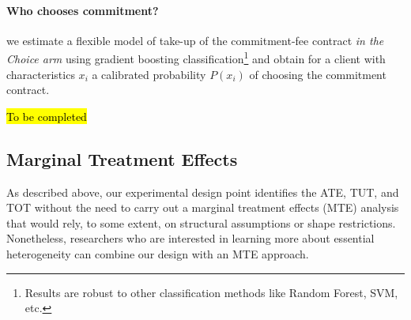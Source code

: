 \documentclass[oneside,11pt]{article}
\begin{document}
\paragraph{Who chooses commitment?}

we estimate a flexible model of take-up of the commitment-fee contract \textit{in the Choice arm} using gradient boosting classification\footnote{Results are robust to other classification methods like Random Forest, SVM, etc.} and obtain for a client with characteristics $x_i$ a calibrated probability $P(x_i)$ of choosing the commitment contract.

\hl{To be completed}


\subsection{Marginal Treatment Effects}
As described above, our experimental design point identifies the ATE, TUT, and TOT without the need to carry out a marginal treatment effects (MTE) analysis that would rely, to some extent, on structural assumptions or shape restrictions. Nonetheless, researchers who are interested in learning more about essential heterogeneity can combine our design with an MTE approach.
\end{document}
